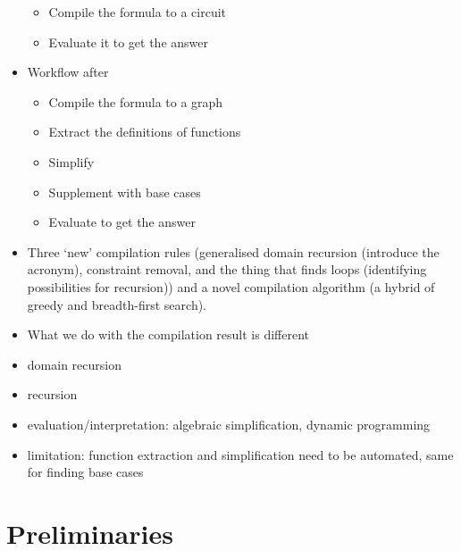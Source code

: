 \begin{itemize}
\begin{itemize}
    \item Compile the formula to a circuit
    \item Evaluate it to get the answer
  \end{itemize}
  \item Workflow after
  \begin{itemize}
    \item Compile the formula to a graph
    \item Extract the definitions of functions
    \item Simplify
    \item Supplement with base cases
    \item Evaluate to get the answer
  \end{itemize}
  \item Three `new' compilation rules (generalised domain recursion (introduce
        the acronym), constraint removal, and the thing that finds loops
        (identifying possibilities for recursion)) and a novel compilation
        algorithm (a hybrid of greedy and breadth-first search).
  \item What we do with the compilation result is different
  \item domain recursion \citep{DBLP:conf/nips/Broeck11}
  \item recursion \citep{DBLP:conf/ilp/BarvinekB0ZK21}
  \item evaluation/interpretation: algebraic simplification, dynamic programming
  \item limitation: function extraction and simplification need to be automated,
        same for finding base cases
\end{itemize}

\section{Preliminaries}


